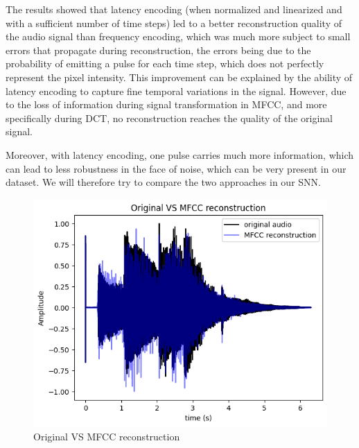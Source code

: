 \documentclass[11pt]{article}
\begin{document}
The results showed that latency encoding (when normalized and linearized and with a sufficient number of time steps) led to a better reconstruction quality of the audio signal than frequency encoding, which was much more subject to small errors that propagate during reconstruction, the errors being due to the probability of emitting a pulse for each time step, which does not perfectly represent the pixel intensity. This improvement can be explained by the ability of latency encoding to capture fine temporal variations in the signal. However, due to the loss of information during signal transformation in MFCC, and more specifically during DCT, no reconstruction reaches the quality of the original signal.

Moreover, with latency encoding, one pulse carries much more information, which can lead to less robustness in the face of noise, which can be very present in our dataset. We will therefore try to compare the two approaches in our SNN.

\begin{figure}[h]
  \centering
  \begin{minipage}{0.45\textwidth}
    \centering
    \includegraphics[width=1\textwidth]{"image/Original VS MFCC reconstruction.png"}
    \caption{Original VS MFCC reconstruction}
    \label{fig:OVSM}
  \end{minipage}\hfill
\end{figure}
\end{document}
